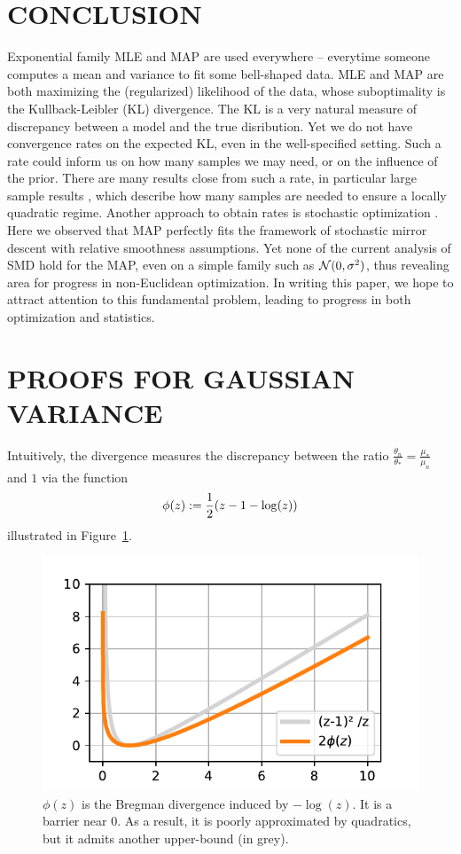 \documentclass[twoside]{article}
\let\oldsection\section
\renewcommand{\section}[1]{\oldsection{\texorpdfstring{\uppercase{#1}}{#1}}}
\newcommand{\nat}{\theta}
\newcommand{\m}{\mu}
\begin{document}
\section{Conclusion}
Exponential family MLE and MAP are used everywhere -- everytime someone computes a mean and variance to fit some bell-shaped data.
MLE and MAP are both maximizing the (regularized) likelihood of the data, whose suboptimality is the Kullback-Leibler (KL) divergence.
The KL is a very natural measure of discrepancy between a model and the true disribution.
Yet we do not have convergence rates on the expected KL, even in the well-specified setting.
Such a rate could inform us on how many samples we may need, or on the influence of the prior.
There are many results close from such a rate, in particular large sample results \citep{kakade2010learning, ostrovskii2021finite}, which describe how many samples are needed to ensure a locally quadratic regime.
Another approach to obtain rates is stochastic optimization \citep{bach2013nonstronglyconvex}.
Here we observed that MAP perfectly fits the framework of stochastic mirror descent with relative smoothness assumptions.
Yet none of the current analysis of SMD hold for the MAP, even on a simple family such as ${\mathcal N}(0,\sigma^2)$, thus revealing area for progress in non-Euclidean optimization.
In writing this paper, we hope to attract attention to this fundamental problem, leading to progress in both optimization and statistics.



\newpage




\clearpage
\appendix
\onecolumn

\section{PROOFS FOR GAUSSIAN VARIANCE}
\label{app:gaussian-variance}

Intuitively, the divergence measures the discrepancy between the ratio $\frac{ \nat_n}{\nat_*} =  \frac{\m_*}{ \m_n}  $ and $1$ via the function
\begin{align}
	\phi(z) := \frac{1}{2} (z - 1 - \log(z))
\end{align}
illustrated in Figure~\ref{fig:phi}.
\begin{figure}[ht]
	\centering
	\includegraphics[width=.4\textwidth]{phi.pdf}
	\caption{$\phi(z)$ is the Bregman divergence induced by $-\log(z)$. It is a barrier near $0$. As a result, it is poorly approximated by quadratics, but it admits another upper-bound (in grey).}
	\label{fig:phi}
\end{figure}
\end{document}
